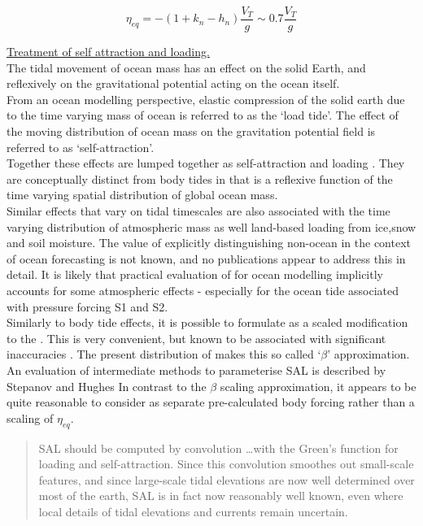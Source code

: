 \begin{equation}
\eta_{eq} = -(1+k_n-h_n) \frac{V_T}{g} \sim 0.7 \frac{V_T}{g}
\end{equation} 



\underline{Treatment of self attraction and loading.} \\
The tidal movement of ocean mass has an effect on the solid Earth, and reflexively on the gravitational potential acting on the ocean itself.\\
From an ocean modelling perspective, elastic compression of the solid earth due to the time varying mass of ocean is referred to as the `load tide'.  The effect of the moving distribution of ocean mass on the gravitation potential field is referred to as `self-attraction'.\\
Together these effects are lumped together as self-attraction and loading \SAL{}.  They are conceptually distinct from body tides in that \SAL{} is a reflexive function of the time varying spatial distribution of global ocean mass.\\
Similar effects that vary on tidal timescales are also associated with the time varying distribution of atmospheric mass as well land-based loading from ice,snow and soil moisture.  The value of explicitly distinguishing non-ocean \SAL{} in the context of ocean forecasting is not known, and no publications appear to address this in detail.  It is likely that practical evaluation of \SAL{} for ocean modelling implicitly accounts for some atmospheric effects - especially for the ocean tide associated with pressure forcing S1 and S2.\\



Similarly to body tide effects, it is possible to formulate \SAL{} as a scaled modification to the \ATGF{}.  This is very convenient, but known to be associated with significant inaccuracies \citep{Ray:1998jl}.  The present distribution of \MOM{} makes this so called `$\beta$' approximation.\\
An evaluation of intermediate methods to parameterise SAL is described by Stepanov and Hughes \cite{Stepanov:2004up}
In contrast to the $\beta$ scaling approximation, it appears to be quite reasonable to consider \SAL{} as separate pre-calculated body forcing rather than a scaling of $\eta_{eq}$. 
\begin{quotation}
SAL should be computed by convolution \dots with the Green's function for loading and self-attraction. Since this convolution smoothes out small-scale features, and since large-scale tidal elevations are now well determined over most	of the earth, SAL is in fact now reasonably well known, even where local details of tidal elevations and currents remain uncertain. \citep{Egbert:2002ug}
\end{quotation}




